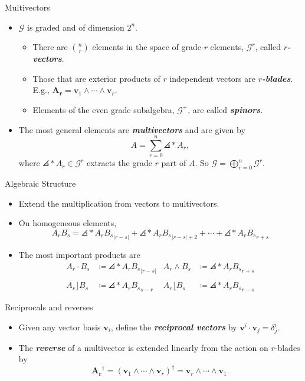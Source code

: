 \documentclass[aspectratio=169]{beamer}
\newcommand\boldgreen[1]{\textcolor{lighter_csu_green}{\emph{\textbf{#1}}}}
\newcommand{\G}{\mathcal{G}}
\newcommand{\blade}[1]{\boldsymbol{#1}}
\DeclarePairedDelimiter\angles{\langle}{\rangle}
\newcommand{\proj}[2]{\angles*{#2}_{#1}}
\begin{document}
\begin{frame}{Multivectors}
\vfill
\begin{itemize}
    \pause
        \item $\G$ is graded and of dimension $2^n$.
    \begin{itemize}
        \pause
        \item There are ${n \choose r}$ elements in the space of grade-$r$ elements, $\G^r$, called \boldgreen{$r$-vectors}. 
        \pause
        \item Those that are exterior products of $r$ independent vectors are \boldgreen{$r$-blades}. E.g., $\blade{A_r}=\blade{v}_1 \wedge \cdots \wedge\blade{v}_r$.
        \pause
        \item Elements of the even grade subalgebra, $\G^+$, are called \boldgreen{spinors}.
    \end{itemize}
        \pause
        \item The most general elements are \boldgreen{multivectors} and are given by
        \[
        A = \sum_{r=0}^n \proj{r}{A},
        \]
        where $\proj{r}{A}\in \G^r$ extracts the grade $r$ part of $A$. So $\displaystyle{\G=\bigoplus_{r=0}^n \G^r}$.
\end{itemize}
\vfill
\end{frame}

\begin{frame}{Algebraic Structure}
\vfill
\begin{itemize}
\pause
\item Extend the multiplication from vectors to multivectors. 
\pause
\item On homogeneous elements,
\[
A_r B_s = \proj{|r-s|}{A_r B_s} + \proj{|r-s|+2}{A_r B_s} + \cdots + \proj{r+s}{A_r B_s}
\]
\pause
\item The most important products are
\begin{align*}
A_r \cdot B_s &\coloneqq \proj{|r-s|}{A_r B_s}  & A_r \wedge B_s &\coloneqq \proj{r+s}{A_r B_s}\\
~\\
A_r \rfloor B_s &\coloneqq \proj{s-r}{A_r B_s}  & A_r \lfloor B_s &\coloneqq \proj{r-s}{A_r B_s}
\end{align*}
\end{itemize}
\vfill
\end{frame}

\begin{frame}{Reciprocals and reverses}
\vfill
\begin{itemize}
\pause
\item Given any vector basis $\blade{v}_i$, define the \boldgreen{reciprocal vectors} by $\blade{v}^i\cdot \blade{v}_j = \delta^i_j$.
\pause
\item The \boldgreen{reverse} of a multivector is extended linearly from the action on $r$-blades by
\[
\blade{A_r}^\dagger = (\blade{v}_1 \wedge \cdots \wedge\blade{v}_r)^\dagger = \blade{v}_r \wedge \cdots \wedge\blade{v}_1.
\]
\end{itemize}
\vfill
\end{frame}
\end{document}
